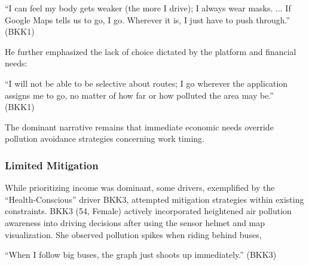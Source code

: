 \begin{quoteb}
    ``I can feel my body gets weaker (the more I drive); I always wear masks. ... If Google Maps tells us to go, I go. Wherever it is, I just have to push through.'' (BKK1)
\end{quoteb}

He further emphasized the lack of choice dictated by the platform and financial needs:

\begin{quoteb}
    ``I will not be able to be selective about routes; I go wherever the application assigns me to go, no matter of how far or how polluted the area may be.'' (BKK1)
\end{quoteb}



The dominant narrative remains that immediate economic needs override pollution avoidance strategies concerning work timing.

\subsubsection{Limited Mitigation}
While prioritizing income was dominant, some drivers, exemplified by the ``Health-Conscious'' driver BKK3, attempted mitigation strategies within existing constraints.
BKK3 (54, Female) actively incorporated heightened air pollution awareness into driving decisions after using the sensor helmet and map visualization.
She observed pollution spikes when riding behind buses,
\begin{quoteb}
    ``When I follow big buses, the graph just shoots up immediately.'' (BKK3)
\end{quoteb}

